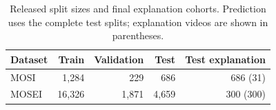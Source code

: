 \begin{table}[!htbp]\centering\small
\caption{Released split sizes and final explanation cohorts. Prediction uses the complete test splits; explanation videos are shown in parentheses.}\label{tab:data}
\begin{tabular}{lrrrr}\toprule
Dataset & Train & Validation & Test & Test explanation\\\midrule
MOSI & 1,284 & 229 & 686 & 686 (31)\\
MOSEI & 16,326 & 1,871 & 4,659 & 300 (300)\\\bottomrule
\end{tabular}\end{table}
